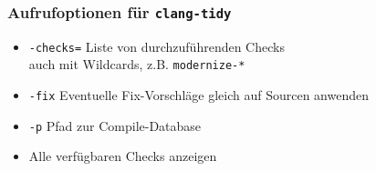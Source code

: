 \documentclass[aspectratio=169]{beamer}
\begin{document}
\begin{frame}
  \frametitle{Aufrufoptionen für \texttt{clang-tidy}}
  \begin{itemize}
  \item \texttt{-checks=} Liste von durchzuführenden Checks\\
    \qquad auch mit Wildcards, z.B. \texttt{modernize-*}
  \item \texttt{-fix} Eventuelle Fix-Vorschläge gleich auf Sourcen anwenden
  \item \texttt{-p} Pfad zur Compile-Database
  \end{itemize}
\end{frame}
\begin{itemize}
\item Alle verfügbaren Checks anzeigen
\end{itemize}
\end{document}
